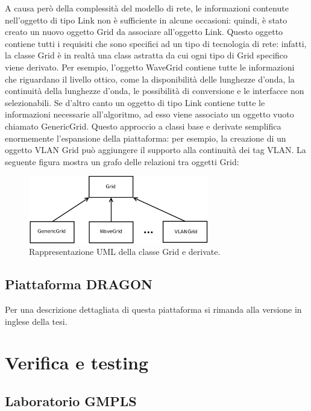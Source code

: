 \documentclass[10pt,a4paper]{report}
\begin{document}
A causa però della complessità del modello di rete, le informazioni
contenute nell'oggetto di tipo Link non è sufficiente in alcune
occasioni: quindi, è stato creato un nuovo oggetto Grid da associare
all'oggetto Link. Questo oggetto contiene tutti i requisiti che sono
specifici ad un tipo di tecnologia di rete: infatti, la classe Grid è
in realtà una class astratta da cui ogni tipo di Grid specifico viene
derivato. Per esempio, l'oggetto WaveGrid contiene tutte le
informazioni che riguardano il livello ottico, come la disponibilità
delle lunghezze d'onda, la continuità della lunghezze d'onda, le
possibilità di conversione e le interfacce non selezionabili. Se
d'altro canto un oggetto di tipo Link contiene tutte le informazioni
necessarie all'algoritmo, ad esso viene associato un oggetto vuoto
chiamato GenericGrid. Questo approccio a classi base e derivate
semplifica enormemente l'espansione della piattaforma: per esempio, la
creazione di un oggetto VLAN Grid può aggiungere il supporto alla
continuità dei tag VLAN. La seguente figura mostra un grafo delle
relazioni tra oggetti Grid:\\

\begin{figure}[!htbp]
  \begin{center}
    \includegraphics[width=0.7\textwidth]{img/grid_uml}
    \caption[]{Rappresentazione UML della classe Grid e derivate.}
  \end{center}
\end{figure}

\subsection*{Piattaforma DRAGON}

Per una descrizione dettagliata di questa piattaforma si rimanda alla
versione in inglese della tesi.

\section*{Verifica e testing}

\subsection*{Laboratorio GMPLS}
\end{document}
